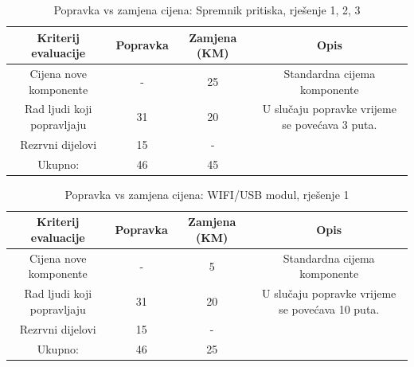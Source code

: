 \documentclass[12pt]{article}
\begin{document}
\begin{landscape}
\vspace*{\fill}
\begin{table}[htbp]
  \centering
  \footnotesize
  \caption{Popravka vs zamjena cijena: Spremnik pritiska, rješenje 1, 2, 3}
    \begin{tabular}{cccc}
    \toprule
    Kriterij evaluacije & Popravka & Zamjena (KM) & Opis \\
    \midrule
     Cijena nove komponente & -     & 25    & \multicolumn{1}{p{19.57em}}{Standardna \newline{}cijema\newline{} komponente} \\
    \midrule
    Rad ljudi koji popravljaju & 31    & 20    & \multicolumn{1}{p{19.57em}}{ U slučaju popravke vrijeme se povećava 3 puta. } \\
    \midrule
    Rezrvni dijelovi & 15    & -     &  \\
    \midrule
    Ukupno: & 46    & 45    &  \\
    \bottomrule
    \end{tabular}%
  \label{tab:addlabel}%
\end{table}%

\begin{table}[htbp]
  \centering
  \footnotesize
  \caption{Popravka vs zamjena cijena: WIFI/USB modul, rješenje 1}
    \begin{tabular}{cccc}
    \toprule
    Kriterij evaluacije & Popravka & Zamjena (KM) & Opis \\
    \midrule
     Cijena nove komponente & -     & 5     & \multicolumn{1}{p{19.57em}}{Standardna \newline{}cijema\newline{} komponente} \\
    \midrule
    Rad ljudi koji popravljaju & 31    & 20    & \multicolumn{1}{p{19.57em}}{ U slučaju popravke vrijeme se povećava 10 puta. } \\
    \midrule
    Rezrvni dijelovi & 15    & -     &  \\
    \midrule
    Ukupno: & 46    & 25    &  \\
    \bottomrule
    \end{tabular}%
  \label{tab:addlabel}%
\end{table}%


\end{landscape}
\end{document}
